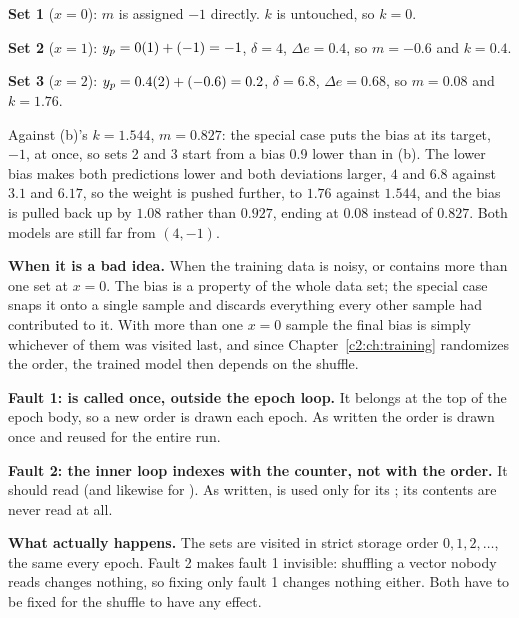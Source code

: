 \textbf{Set 1} ($x = 0$): $m$ is assigned $-1$ directly. $k$ is untouched, so $k = 0$. 

\textbf{Set 2} ($x = 1$): $y_{p} = 0(1) + (-1) = -1$, $\delta = 4$, $\Delta e = 0.4$, so $m = -0.6$
and $k = 0.4$.

\textbf{Set 3} ($x = 2$): $y_{p} = 0.4(2) + (-0.6) = 0.2$, $\delta = 6.8$, $\Delta e = 0.68$, so
$m = \mathbf{0.08}$ and $k = \mathbf{1.76}$. 

Against (b)'s $k = 1.544$, $m = 0.827$: the special case puts the bias at its target, $-1$, at once,
so sets 2 and 3 start from a bias 0.9 lower than in (b). The lower bias makes both predictions lower
and both deviations larger, $4$ and $6.8$ against $3.1$ and $6.17$, so the weight is pushed further,
to $1.76$ against $1.544$, and the bias is pulled back up by $1.08$ rather than $0.927$, ending at
$0.08$ instead of $0.827$. Both models are still far from $(4, -1)$.

\textbf{When it is a bad idea.} When the training data is noisy, or contains more than one set at
$x = 0$. The bias is a property of the whole data set; the special case snaps it onto a single
sample and discards everything every other sample had contributed to it. With more than one $x = 0$
sample the final bias is simply whichever of them was visited last, and since
Chapter~\ref{c2:ch:training} randomizes the order, the trained model then depends on the shuffle.


\textbf{Fault 1:  is called once, outside the epoch loop.} It belongs at
the top of the epoch body, so a new order is drawn each epoch. As written the order is drawn once
and reused for the entire run. 

\textbf{Fault 2: the inner loop indexes with the counter, not with the order.} It should read
 (and likewise for ). As written,
 is used only for its ; its contents are never read at all.

\textbf{What actually happens.} The sets are visited in strict storage order $0, 1, 2, \ldots$, the
same every epoch. Fault 2 makes fault 1 invisible: shuffling a vector nobody reads changes nothing,
so fixing only fault 1 changes nothing either. Both have to be fixed for the shuffle to have any
effect. 

